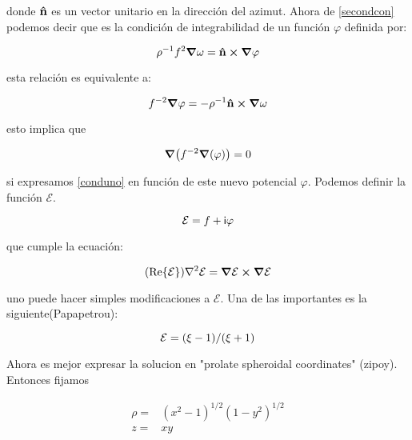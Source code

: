 \documentclass[../Main.tex]{subfiles}
\begin{document}
donde $\vu{n}$ es un vector unitario en la dirección del azimut. Ahora de \eqref{secondcon} podemos decir que es la condición de integrabilidad de un función $\varphi$ definida por:

\begin{equation}
    \rho^{-1}f^{2}\grad{\omega}=\vu{n}\cp\grad{\varphi}
\end{equation}

esta relación es equivalente a:

\begin{equation}
    f^{-2}\grad{\varphi}=-\rho^{-1}\vu{n}\cp\grad{\omega}
\end{equation}

esto implica que

\begin{equation}
    \grad(f^{-2}\grad(\varphi))=0
\end{equation}

si expresamos \eqref{conduno} en función de este nuevo potencial $\varphi$. Podemos definir la función $\mathcal{E}$.

\begin{equation}
    \mathcal{E}=f+\mathsf{i} \varphi
\end{equation}

que cumple la ecuación:

\begin{equation}
    \qty(\Re{\mathcal{E}})\laplacian{\mathcal{E}}=\grad{\mathcal{E}}\cp\grad{\mathcal{E}}
\end{equation}

uno puede hacer simples modificaciones a $\mathcal{E}$. Una de las importantes es la siguiente(Papapetrou):

\begin{equation}
    \mathcal{E}=\qty(\xi-1)/\qty(\xi+1)
\end{equation}

Ahora es mejor expresar la solucion en "prolate spheroidal coordinates" (zipoy). Entonces fijamos

\begin{eqnarray}
    \rho= & (x^2-1)^{1/2}(1-y^{2})^{1/2} \\
    z = & xy
\end{eqnarray}









\biblio %
\end{document}

